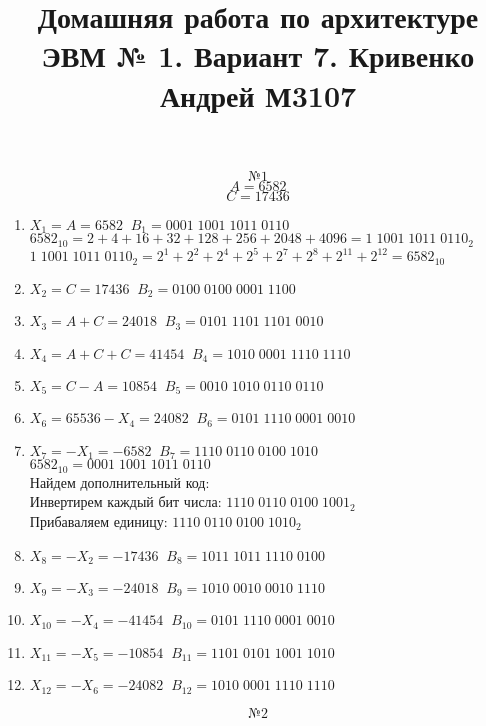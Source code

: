 \documentclass{article}
\title{Домашняя работа по архитектуре ЭВМ № 1. Вариант 7. Кривенко Андрей М3107}
\begin{document}
\maketitle
\[ № 1 \]
\[ A = 6582 \]
\[ C = 17436 \]
\begin{enumerate}
  \item $ X_{1} = A = 6582 \; \; B_{1} = 0001 \; 1001 \; 1011 \; 0110 $ \\ 
 $ 6582_{10} = 2 + 4 + 16 + 32 + 128 + 256 + 2048 + 4096 = 1 \; 1001 \; 1011 \; 0110_{2} $
 $ 1 \; 1001 \; 1011 \; 0110_{2} = 2^{1} + 2^{2} +2^{4} + 2^{5} + 2^{7} + 2^{8} + 2^{11} + 2^{12} = 6582_{10} $
  \item $ X_{2} = C = 17436 \; \; B_{2} = 0100 \; 0100 \; 0001 \; 1100 $
  \item $ X_{3} = A + C = 24018 \; \; B_{3} = 0101 \; 1101 \; 1101 \; 0010 $
  \item $ X_{4} = A + C + C = 41454 \; \; B_{4} = 1010 \; 0001 \; 1110 \; 1110 $ 
  \item $ X_{5} = C - A = 10854 \; \; B_{5} = 0010 \; 1010 \; 0110 \; 0110 $
  \item $ X_{6} = 65536 - X_{4} = 24082 \; \; B_{6} = 0101 \; 1110 \; 0001 \; 0010 $
  \item $ X_{7} = -X_{1} = -6582 \; \; B_{7} = 1110 \; 0110 \; 0100 \; 1010 $ \\
  $ 6582_{10} = 0001 \; 1001 \; 1011 \; 0110 $ \\
  Найдем дополнительный код: \\
  Инвертирем каждый бит числа: $ 1110 \; 0110 \; 0100 \; 1001_{2} $ \\
  Прибаваляем единицу: $ 1110 \; 0110 \; 0100 \; 1010_{2} $
  \item $ X_{8} = -X_{2} = -17436 \; \; B_{8} = 1011 \; 1011 \; 1110 \; 0100 $
  \item $ X_{9} = -X_{3} = -24018 \; \; B_{9} = 1010 \; 0010 \; 0010 \; 1110 $
  \item $ X_{10} = -X_{4} = -41454 \; \; B_{10} = 0101 \; 1110 \; 0001 \; 0010 $ 
  \item $ X_{11} = -X_{5} = -10854 \; \; B_{11} = 1101 \; 0101 \; 1001 \; 1010 $
  \item $ X_{12} = -X_{6} = -24082 \; \; B_{12} = 1010 \; 0001 \; 1110 \; 1110 $
\end{enumerate}
\[ № 2 \]
\end{document}
